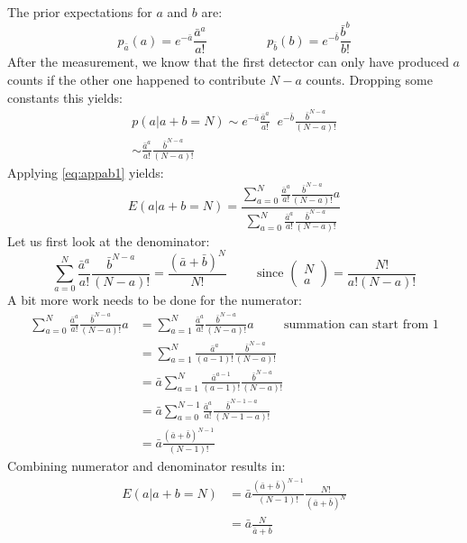 \documentclass[11pt,oneside]{article}
\begin{document}
The prior expectations for $a$ and $b$ are:
\begin{equation}
  p_{\bar{a}}(a) = e^{-\bar{a}} \frac{\bar{a}^a}{a!} \hspace{2cm}
  p_{\bar{b}}(b) = e^{-\bar{b}} \frac{\bar{b}^b}{b!}
\end{equation}
After the measurement, we know that the first detector can only have produced
$a$ counts if the other one happened to contribute $N-a$ counts. Dropping some
constants this yields:
\begin{align}
  p(a | a + b = N) \sim e^{-\bar{a}} \frac{\bar{a}^a}{a!} \;\;
                        e^{-\bar{b}} \frac{\bar{b}^{N-a}}{(N-a)!}\\
    \sim \frac{\bar{a}^a}{a!} \frac{\bar{b}^{N-a}}{(N-a)!}
\end{align}
Applying \ref{eq:appab1} yields:
\begin{equation}
  E(a | a+b=N)
  = \frac{\sum_{a=0}^N \frac{\bar{a}^a}{a!} \frac{\bar{b}^{N-a}}{(N-a)!} a}
         {\sum_{a=0}^N \frac{\bar{a}^a}{a!} \frac{\bar{b}^{N-a}}{(N-a)!}}
\end{equation}
Let us first look at the denominator:
\begin{equation}
  \sum_{a=0}^N \frac{\bar{a}^a}{a!} \frac{\bar{b}^{N-a}}{(N-a)!}
  = \frac{(\bar{a} + \bar{b})^N}{N!}
\hspace{1cm} \mbox{since } \left( \begin{array}{cc} N\\a \end{array}\right)
   = \frac{N!}{a! (N-a)!}
\end{equation}
A bit more work needs to be done for the numerator:
\begin{align}
 \sum_{a=0}^N \frac{\bar{a}^a}{a!} \frac{\bar{b}^{N-a}}{(N-a)!} a
  & = \sum_{a=1}^N \frac{\bar{a}^a}{a!} \frac{\bar{b}^{N-a}}{(N-a)!} a
    \hspace{1cm} \mbox{summation can start from 1}\\
  & = \sum_{a=1}^N \frac{\bar{a}^a}{(a-1)!} \frac{\bar{b}^{N-a}}{(N-a)!}\\
  & = \bar{a} \sum_{a=1}^N \frac{\bar{a}^{a-1}}{(a-1)!}
                             \frac{\bar{b}^{N-a}}{(N-a)!}\\
  & = \bar{a} \sum_{a=0}^{N-1} \frac{\bar{a}^a}{a!} 
                                 \frac{\bar{b}^{N-1-a}}{(N-1-a)!}\\
  & = \bar{a} \frac{(\bar{a} + \bar{b})^{N-1}}{(N-1)!}
\end{align}
Combining numerator and denominator results in:
\begin{align}
  E(a | a+b=N) &= \bar{a} \frac{(\bar{a} + \bar{b})^{N-1}}{(N-1)!}
                     \frac{N!}{(\bar{a} + \bar{b})^N}\\
  &= \bar{a} \frac{N}{\bar{a} + \bar{b}}
\end{align}
\end{document}
